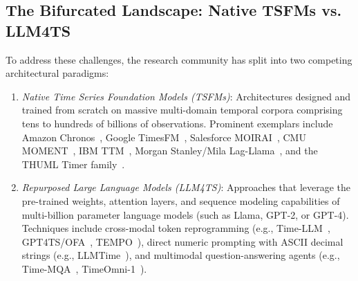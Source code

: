 \subsection{The Bifurcated Landscape: Native TSFMs vs. LLM4TS}
To address these challenges, the research community has split into two competing architectural paradigms:
\begin{enumerate}[leftmargin=*]
    \item \emph{Native Time Series Foundation Models (TSFMs)}: Architectures designed and trained from scratch on massive multi-domain temporal corpora comprising tens to hundreds of billions of observations. Prominent exemplars include Amazon Chronos~\cite{ansari2024chronos,ansari2025chronos2}, Google TimesFM~\cite{das2024timesfm,das2024incontext}, Salesforce MOIRAI~\cite{woo2024moirai,woo2024moiraimoe,woo2025moirai2}, CMU MOMENT~\cite{goswami2024moment}, IBM TTM~\cite{ekambaram2024ttm}, Morgan Stanley/Mila Lag-Llama~\cite{rasul2023lagllama}, and the THUML Timer family~\cite{liu2024timer,liu2024timerxl,thuml2025sundial,thuml2026timers1}.
    \item \emph{Repurposed Large Language Models (LLM4TS)}: Approaches that leverage the pre-trained weights, attention layers, and sequence modeling capabilities of multi-billion parameter language models (such as Llama, GPT-2, or GPT-4). Techniques include cross-modal token reprogramming (e.g., Time-LLM~\cite{jin2023timellm}, GPT4TS/OFA~\cite{zhou2023onefitsall}, TEMPO~\cite{cao2023tempo}), direct numeric prompting with ASCII decimal strings (e.g., LLMTime~\cite{gruver2023llmtime}), and multimodal question-answering agents (e.g., Time-MQA~\cite{jin2025timemqa}, TimeOmni-1~\cite{jin2025timeomni}).
\end{enumerate}

